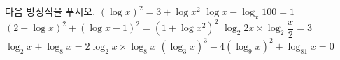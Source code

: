 다음 방정식을 푸시오.
 $(\log x)^2=3+\log x^2$
 $\log x-\log_x 100=1$
 $(2+\log x)^2+(\log x-1)^2=(1+\log x^2)^2$
 $\log_2 2x\times\log_2 \dfrac{x}{2}=3$
 $\log_2 x+\log_8 x=2\log_2 x\times\log_8 x$
 $(\log_3 x)^3-4(\log_9 x)^2+\log_{81} x=0$
